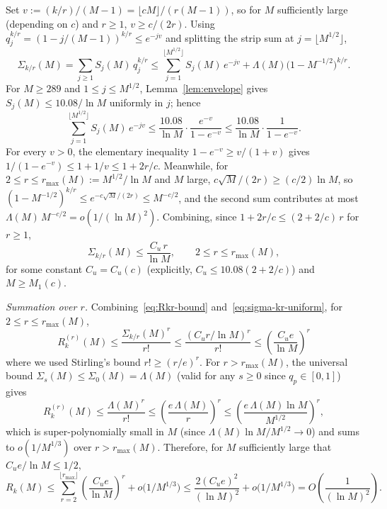 \documentclass[11pt]{article}
\theoremstyle{remark}
\begin{document}
Set $v := (k/r)/(M-1) = \lfloor cM \rfloor/(r(M-1))$, so for $M$ sufficiently large (depending on $c$) and $r \geq 1$, $v \geq c/(2r)$. Using $q_j^{k/r} = (1 - j/(M-1))^{k/r} \leq e^{-jv}$ and splitting the strip sum at $j = \lfloor M^{1/2} \rfloor$,
\[
\Sigma_{k/r}(M) = \sum_{j \geq 1} S_j(M)\, q_j^{k/r} \leq \sum_{j=1}^{\lfloor M^{1/2}\rfloor} S_j(M)\, e^{-jv} + \Lambda(M)\bigl(1 - M^{-1/2}\bigr)^{k/r}.
\]
For $M \geq 289$ and $1 \leq j \leq M^{1/2}$, Lemma~\ref{lem:envelope} gives $S_j(M) \leq 10.08/\ln M$ uniformly in $j$; hence
\[
\sum_{j=1}^{\lfloor M^{1/2}\rfloor} S_j(M)\, e^{-jv} \leq \frac{10.08}{\ln M} \cdot \frac{e^{-v}}{1 - e^{-v}} \leq \frac{10.08}{\ln M} \cdot \frac{1}{1 - e^{-v}}.
\]
For every $v > 0$, the elementary inequality $1 - e^{-v} \geq v/(1+v)$ gives $1/(1 - e^{-v}) \leq 1 + 1/v \leq 1 + 2r/c$. Meanwhile, for $2 \leq r \leq r_{\max}(M) := M^{1/2}/\ln M$ and $M$ large, $c\sqrt{M}/(2r) \geq (c/2) \ln M$, so $(1 - M^{-1/2})^{k/r} \leq e^{-c\sqrt{M}/(2r)} \leq M^{-c/2}$, and the second sum contributes at most $\Lambda(M)\, M^{-c/2} = o(1/(\ln M)^2)$. Combining, since $1 + 2r/c \leq (2 + 2/c)\, r$ for $r \geq 1$,
\begin{equation}\label{eq:sigma-kr-uniform}
\Sigma_{k/r}(M) \leq \frac{C_u\, r}{\ln M}, \qquad 2 \leq r \leq r_{\max}(M),
\end{equation}
for some constant $C_u = C_u(c)$ (explicitly, $C_u \leq 10.08 (2 + 2/c)$) and $M \geq M_1(c)$.

\emph{Summation over $r$.}
Combining~\eqref{eq:Rkr-bound} and~\eqref{eq:sigma-kr-uniform}, for $2 \leq r \leq r_{\max}(M)$,
\[
R_k^{(r)}(M) \leq \frac{\Sigma_{k/r}(M)^r}{r!} \leq \frac{(C_u r/\ln M)^r}{r!} \leq \left(\frac{C_u e}{\ln M}\right)^{\!r}
\]
where we used Stirling's bound $r! \geq (r/e)^r$. For $r > r_{\max}(M)$, the universal bound $\Sigma_s(M) \leq \Sigma_0(M) = \Lambda(M)$ (valid for any $s \geq 0$ since $q_p \in [0, 1]$) gives
\[
R_k^{(r)}(M) \leq \frac{\Lambda(M)^r}{r!} \leq \left(\frac{e\,\Lambda(M)}{r}\right)^{\!r} \leq \left(\frac{e\,\Lambda(M)\ln M}{M^{1/2}}\right)^{\!r},
\]
which is super-polynomially small in $M$ (since $\Lambda(M)\ln M / M^{1/2} \to 0$) and sums to $o(1/M^{1/3})$ over $r > r_{\max}(M)$. Therefore, for $M$ sufficiently large that $C_u e / \ln M \leq 1/2$,
\begin{equation}\label{eq:Rk-total}
R_k(M) \leq \sum_{r=2}^{\lfloor r_{\max}\rfloor} \left(\frac{C_u e}{\ln M}\right)^{\!r} + o\bigl(1/M^{1/3}\bigr) \leq \frac{2(C_u e)^2}{(\ln M)^2} + o\bigl(1/M^{1/3}\bigr) = O\!\left(\frac{1}{(\ln M)^2}\right).
\end{equation}
\end{document}
